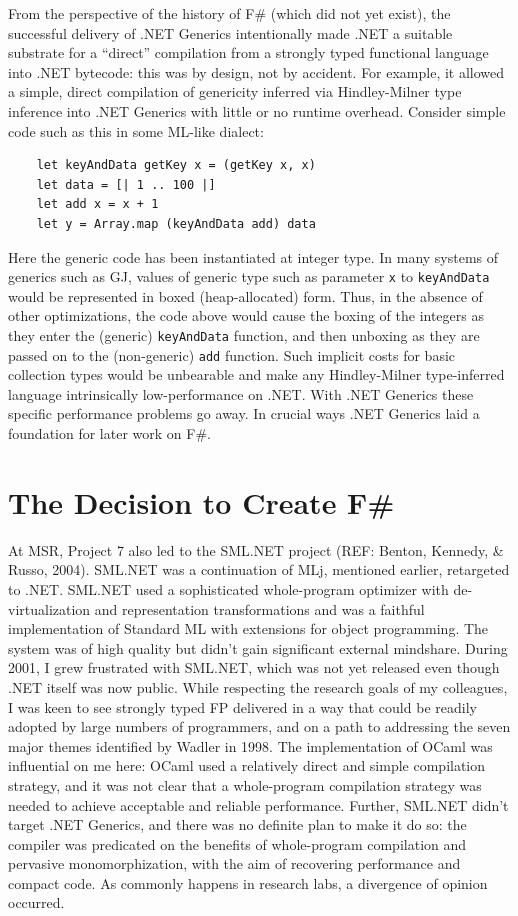 \documentclass[acmsmall]{acmart}\settopmatter{}
\begin{document}
From the perspective of the history of F\# (which did not yet exist), the successful delivery of .NET Generics intentionally made .NET a suitable substrate
for a “direct” compilation from a strongly typed functional language into .NET bytecode: this was by design, not by accident. For example, it allowed a simple, direct
compilation of genericity inferred via Hindley-Milner type inference into .NET Generics with little or no runtime overhead.  Consider simple code such as this in some ML-like dialect:
\begin{verbatim}
    let keyAndData getKey x = (getKey x, x)
    let data = [| 1 .. 100 |]
    let add x = x + 1
    let y = Array.map (keyAndData add) data
\end{verbatim}

Here the generic code has been instantiated at integer type. In many systems of generics such as GJ, values of generic type such as
parameter \texttt{x} to \texttt{keyAndData} would be represented in boxed (heap-allocated) form.  Thus, in the absence of other optimizations, the code
above would cause the boxing of the integers as they enter the (generic) \texttt{keyAndData} function, and then unboxing as they are passed on
to the (non-generic) \texttt{add} function.  Such implicit costs for basic collection types would be unbearable and make any Hindley-Milner type-inferred language
intrinsically low-performance on .NET. With .NET Generics these specific performance problems go away.  In crucial ways .NET Generics laid a foundation for later work on F\#.


\section*{The Decision to Create F\#}

At MSR, Project 7 also led to the SML.NET project (REF: Benton, Kennedy, \& Russo, 2004).  SML.NET was a continuation of MLj, mentioned earlier, retargeted to
.NET.  SML.NET used a sophisticated whole-program optimizer with de-virtualization and representation transformations and was a faithful implementation of Standard ML
with extensions for object programming. The system was of high quality but didn’t gain significant external mindshare.   During 2001, I grew frustrated with SML.NET,
which was not yet released even though .NET itself was now public. While respecting the research goals of my colleagues, I was keen to see strongly typed FP delivered
in a way that could be readily adopted by large numbers of programmers, and on a path to addressing the seven major themes identified by Wadler in 1998.  The
implementation of OCaml was influential on me here: OCaml used a relatively direct and simple compilation strategy, and it was not clear that a whole-program
compilation strategy was needed to achieve acceptable and reliable performance.  Further, SML.NET didn’t target .NET Generics, and there was no definite plan to
make it do so: the compiler was predicated on the benefits of whole-program compilation and pervasive monomorphization, with the aim of recovering performance
and compact code.  As commonly happens in research labs, a divergence of opinion occurred.
\end{document}
